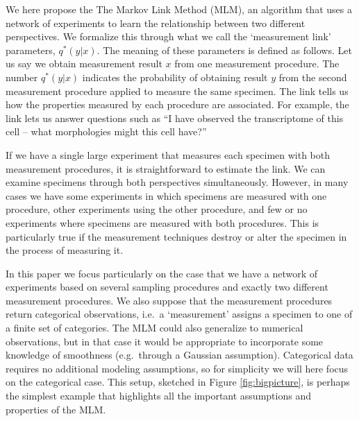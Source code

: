 We here propose the The Markov Link Method (MLM), an algorithm that uses a network of experiments to learn the relationship between two different perspectives.  We formalize this through what we call the `measurement link' parameters, $q^*(y|x)$.  The meaning of these parameters is defined as follows.  Let us say we obtain measurement result $x$ from one measurement procedure.  The number $q^*(y|x)$ indicates the probability of obtaining result $y$ from the second measurement procedure applied to measure the same specimen.  The link tells us how the properties measured by each procedure are associated.  For example, the link lets us answer questions such as ``I have observed the transcriptome of this cell -- what morphologies might this cell have?''

If we have a single large experiment that measures each specimen with both measurement procedures, it is straightforward to estimate the link.   We can examine specimens through both perspectives simultaneously.  However, in many cases we have some experiments in which specimens are measured with one procedure, other experiments using the other procedure, and few or no experiments where specimens are measured with both procedures.  This is particularly true if the measurement techniques destroy or alter the specimen in the process of measuring it.  

In this paper we focus particularly on the case that we have a network of experiments based on several sampling procedures and exactly two different measurement procedures.  We also suppose that the measurement procedures return categorical observations, i.e.\ a `measurement' assigns a specimen to one of a finite set of categories.  The MLM could also generalize to numerical observations, but in that case it would be appropriate to incorporate some knowledge of smoothness (e.g.\ through a Gaussian assumption).  Categorical data requires no additional modeling assumptions, so for simplicity we will here focus on the categorical case.  This setup, sketched in Figure \ref{fig:bigpicture}, is perhaps the simplest example that highlights all the important assumptions and properties of the MLM.

